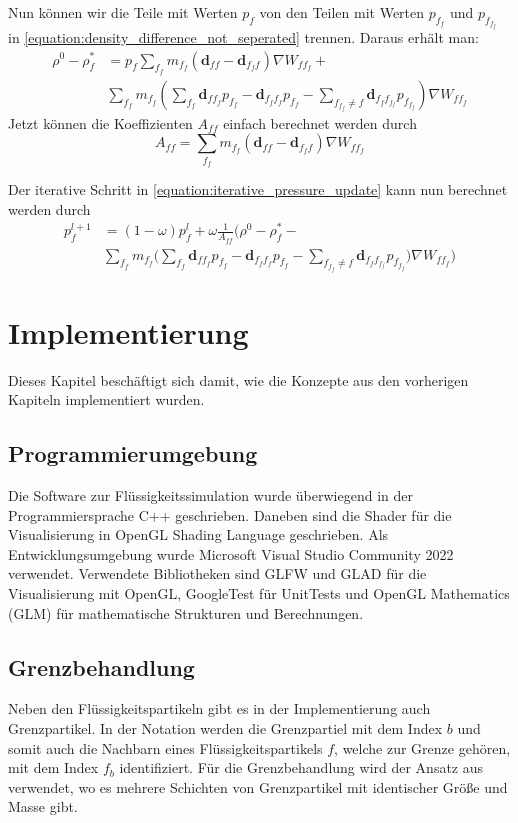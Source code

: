 \documentclass[11pt,
a4paper,
parskip=half, %
BCOR=10mm, %
english,
ngerman]{scrreprt}
\begin{document}
Nun können wir die Teile mit Werten $p_f$ von den Teilen mit Werten $p_{f_f}$ und $p_{f_{f_f}}$ in \eqref{equation:density_difference_not_seperated} trennen.  
Daraus erhält man:
\begin{align}
    \rho^0 - \rho_f^* &= p_f \sum_{f_f} m_{f_f} \left(\textbf{d}_{ff} - \textbf{d}_{f_f f}\right)  \nabla W_{ff_f} +\\
    & \sum_{f_f} m_{f_f} \left(\sum_{f_f} \textbf{d}_{ff_f} p_{f_f} -
    \textbf{d}_{f_f f_f} p_{f_f} - \sum_{f_{f_f} \neq f} \textbf{d}_{f_f f_{f_f}} p_{f_{f_f}} \right) \nabla W_{ff_f}
\end{align}
Jetzt können die Koeffizienten $A_{ff}$ einfach berechnet werden durch
\begin{equation}
    A_{ff} = \sum_{f_f} m_{f_f} \left(\textbf{d}_{ff} - \textbf{d}_{f_f f}\right)  \nabla W_{ff_f}
\end{equation}

Der iterative Schritt in \eqref{equation:iterative_pressure_update} kann nun berechnet werden durch
\begin{align}
    p_f^{l+1} &= (1 - \omega) p_f^l + \omega \frac{1}{A_{ff}} \Biggl(\rho^0 - \rho_f^* - \\
    &\sum_{f_f} m_{f_f} \biggl(\sum_{f_f} \textbf{d}_{ff_f} p_{f_f} -
    \textbf{d}_{f_f f_f} p_{f_f} - \sum_{f_{f_f} \neq f} \textbf{d}_{f_f f_{f_f}} p_{f_{f_f}} \biggr) \nabla W_{ff_f}\Biggr)
\end{align}


\chapter{Implementierung}
Dieses Kapitel beschäftigt sich damit, wie die Konzepte aus den vorherigen Kapiteln implementiert wurden.


\section{Programmierumgebung}
Die Software zur Flüssigkeitssimulation wurde überwiegend in der Programmiersprache C++ geschrieben.
Daneben sind die Shader für die Visualisierung in OpenGL Shading Language geschrieben.
Als Entwicklungsumgebung wurde Microsoft Visual Studio Community 2022 verwendet.
Verwendete Bibliotheken sind GLFW und GLAD für die Visualisierung mit OpenGL,
GoogleTest für UnitTests
und OpenGL Mathematics (GLM) für mathematische Strukturen und Berechnungen.


\section{Grenzbehandlung}
Neben den Flüssigkeitspartikeln gibt es in der Implementierung auch Grenzpartikel.
In der Notation werden die Grenzpartiel mit dem Index $b$ und somit auch die Nachbarn eines Flüssigkeitspartikels $f$,
welche zur Grenze gehören, mit dem Index $f_b$ identifiziert.
Für die Grenzbehandlung wird der Ansatz aus \cite{koschier_smoothed_2020} verwendet, wo es mehrere Schichten von Grenzpartikel mit identischer Größe und Masse gibt.
\end{document}
